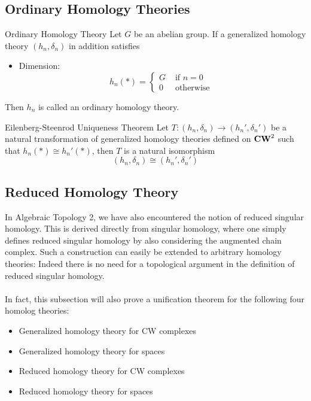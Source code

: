\documentclass[a4paper]{article}
\begin{document}
\subsection{Ordinary Homology Theories}
\begin{defn}{Ordinary Homology Theory}{} Let $G$ be an abelian group. If a generalized homology theory $(h_n,\delta_n)$ in addition satisfies 
\begin{itemize}
\item Dimension: $$h_n(\ast)=\begin{cases}
G & \text{ if } n=0\\
0 & \text{ otherwise }
\end{cases}$$
\end{itemize}
Then $h_n$ is called an ordinary homology theory. 
\end{defn}

\begin{thm}{Eilenberg-Steenrod Uniqueness Theorem}{} Let $T:(h_n,\delta_n)\to(h_n',\delta_n')$ be a natural transformation of generalized homology theories defined on $\bold{CW}^2$ such that $h_n(\ast)\cong h_n'(\ast)$, then $T$ is a natural isomorphism $$(h_n,\delta_n)\cong(h_n',\delta_n')$$
\end{thm}

\subsection{Reduced Homology Theory}
In Algebraic Topology 2, we have also encountered the notion of reduced singular homology. This is derived directly from singular homology, where one simply defines reduced singular homology by also considering the augmented chain complex. Such a construction can easily be extended to arbitrary homology theories: Indeed there is no need for a topological argument in the definition of reduced singular homology. \\~\\

In fact, this subsection will also prove a unification theorem for the following four homolog theories: 
\begin{itemize}
\item Generalized homology theory for CW complexes
\item Generalized homology theory for spaces
\item Reduced homology theory for CW complexes
\item Reduced homology theory for spaces
\end{itemize}
\end{document}
